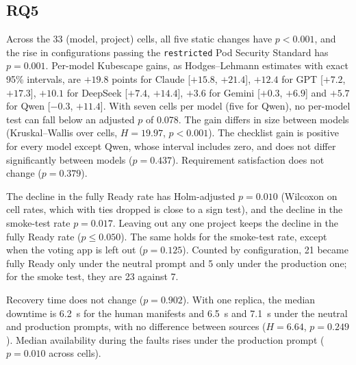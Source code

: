 \subsection{RQ5}

Across the 33 (model, project) cells, all five static changes have $p<0.001$, and the rise in configurations passing the \texttt{restricted} Pod Security Standard has $p=0.001$. Per-model Kubescape gains, as Hodges--Lehmann estimates with exact 95\% intervals, are $+19.8$ points for Claude [$+15.8$, $+21.4$], $+12.4$ for GPT [$+7.2$, $+17.3$], $+10.1$ for DeepSeek [$+7.4$, $+14.4$], $+3.6$ for Gemini [$+0.3$, $+6.9$] and $+5.7$ for Qwen [$-0.3$, $+11.4$]. With seven cells per model (five for Qwen), no per-model test can fall below an adjusted $p$ of 0.078. The gain differs in size between models (Kruskal--Wallis over cells, $H=19.97$, $p<0.001$). The checklist gain is positive for every model except Qwen, whose interval includes zero, and does not differ significantly between models ($p=0.437$). Requirement satisfaction does not change ($p=0.379$).

The decline in the fully Ready rate has Holm-adjusted $p=0.010$ (Wilcoxon on cell rates, which with ties dropped is close to a sign test), and the decline in the smoke-test rate $p=0.017$. Leaving out any one project keeps the decline in the fully Ready rate ($p\le0.050$). The same holds for the smoke-test rate, except when the voting app is left out ($p=0.125$). Counted by configuration, 21 became fully Ready only under the neutral prompt and 5 only under the production one; for the smoke test, they are 23 against 7.

Recovery time does not change ($p=0.902$). With one replica, the median downtime is 6.2~s for the human manifests and 6.5~s and 7.1~s under the neutral and production prompts, with no difference between sources ($H=6.64$, $p=0.249$). Median availability during the faults rises under the production prompt ($p=0.010$ across cells).
